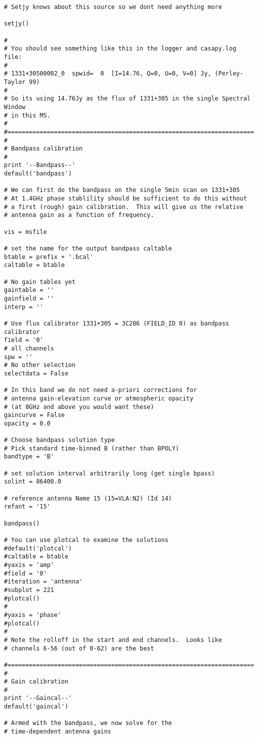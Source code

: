 \begin{verbatim}
# Setjy knows about this source so we dont need anything more

setjy()

#
# You should see something like this in the logger and casapy.log file:
#
# 1331+30500002_0  spwid=  0  [I=14.76, Q=0, U=0, V=0] Jy, (Perley-Taylor 99)
#
# So its using 14.76Jy as the flux of 1331+305 in the single Spectral Window
# in this MS.
#
#=====================================================================
#
# Bandpass calibration
#
print '--Bandpass--'
default('bandpass')

# We can first do the bandpass on the single 5min scan on 1331+305
# At 1.4GHz phase stablility should be sufficient to do this without
# a first (rough) gain calibration.  This will give us the relative
# antenna gain as a function of frequency.

vis = msfile

# set the name for the output bandpass caltable
btable = prefix + '.bcal'
caltable = btable

# No gain tables yet
gaintable = ''
gainfield = ''
interp = ''

# Use flux calibrator 1331+305 = 3C286 (FIELD_ID 0) as bandpass calibrator
field = '0'
# all channels
spw = ''
# No other selection
selectdata = False

# In this band we do not need a-priori corrections for
# antenna gain-elevation curve or atmospheric opacity
# (at 8GHz and above you would want these)
gaincurve = False
opacity = 0.0

# Choose bandpass solution type
# Pick standard time-binned B (rather than BPOLY)
bandtype = 'B'

# set solution interval arbitrarily long (get single bpass)
solint = 86400.0

# reference antenna Name 15 (15=VLA:N2) (Id 14)
refant = '15'

bandpass()

# You can use plotcal to examine the solutions
#default('plotcal')
#caltable = btable
#yaxis = 'amp'
#field = '0'
#iteration = 'antenna'
#subplot = 221
#plotcal()
#
#yaxis = 'phase'
#plotcal()
#
# Note the rolloff in the start and end channels.  Looks like
# channels 6-56 (out of 0-62) are the best

#=====================================================================
#
# Gain calibration
#
print '--Gaincal--'
default('gaincal')

# Armed with the bandpass, we now solve for the
# time-dependent antenna gains


\end{verbatim}
